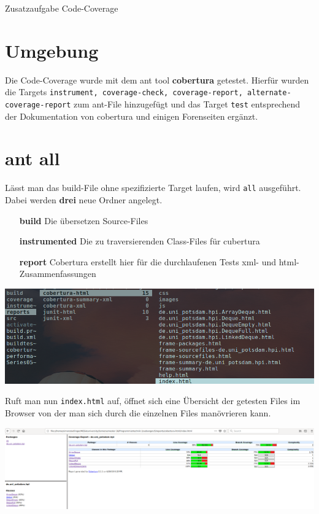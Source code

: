 \documentclass[a4paper,11pt]{scrartcl}
\begin{document}
\begin{center}
{\LARGE Zusatzaufgabe Code-Coverage}
\end{center}

\section{Umgebung}
Die Code-Coverage wurde mit dem ant tool \textbf{cobertura} getestet. Hierfür wurden die Targets \texttt{instrument, coverage-check, coverage-report, alternate-coverage-report} zum ant-File hinzugefügt und das Target \texttt{test} entsprechend der Dokumentation von cobertura und einigen Forenseiten ergänzt. 


\section{ant all}
Lässt man das build-File ohne spezifizierte Target laufen, wird \texttt{all} ausgeführt. Dabei werden \textbf{drei} neue Ordner angelegt.
\begin{itemize}
\item[\textbf{build}] Die übersetzen Source-Files
\item[\textbf{instrumented}] Die zu traversierenden Class-Files für cubertura
\item[\textbf{report}] Cobertura erstellt hier für die durchlaufenen Tests xml- und html-Zusammenfassungen
\end{itemize}
\begin{center}
\includegraphics[scale=0.45]{ordner}
\end{center}
Ruft man nun \texttt{index.html} auf, öffnet sich eine Übersicht der getesten Files im Browser von der man sich durch die einzelnen Files manövrieren kann.
\begin{center}
\includegraphics[scale=0.24]{overview}
\end{center}
\newpage
\end{document}
